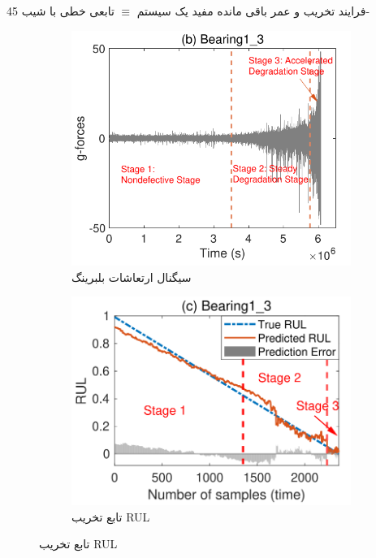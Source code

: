 \documentclass[xcolor=dvipsnames, professionalfonts, aspectratio=169, 11pt]{beamer}
\begin{document}
\begin{persian}
\begin{frame}
	فرایند تخریب و عمر باقی مانده مفید یک سیستم $\equiv$ تابعی خطی با شیب 45-
	
	
	\begin{figure}
		\centering
		\begin{subfigure}[b]{0.45\textwidth}
			\centering
			\includegraphics[width=\textwidth]{img/img4.png}
			\caption{سیگنال ارتعاشات بلبرینگ \cite{wei2024conditional}}
			\label{سیگنال ارتعاشات بلبرینگ}
		\end{subfigure}
		\hspace{0cm}
		\begin{subfigure}[b]{0.5\textwidth}
			\centering
			\includegraphics[width=\textwidth]{img/img5.png}
			\caption{تابع تخریب RUL \cite{wei2024conditional}}
			\label{تابع تخریب RUL}
		\end{subfigure}
		\hspace{0cm}
	\end{figure}
	

\end{frame}
\end{persian}
\end{document}
